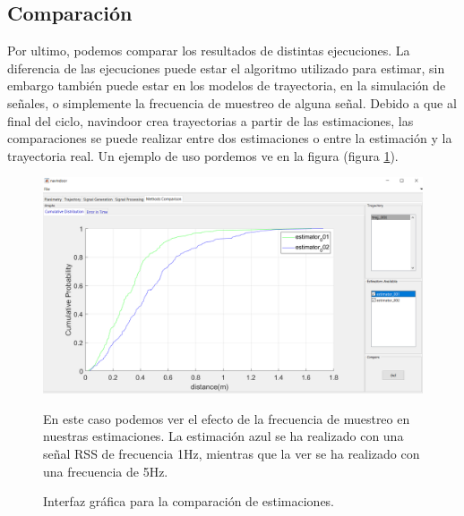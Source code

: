 

\subsection{Comparación}


Por ultimo, podemos comparar los resultados de distintas ejecuciones. La diferencia de las ejecuciones puede estar el algoritmo utilizado para estimar, sin embargo también puede estar en los modelos de trayectoria, en la simulación de señales, o simplemente la frecuencia de muestreo de alguna señal. Debido a que al final del ciclo, navindoor crea trayectorias a partir de las estimaciones, las comparaciones se puede realizar entre dos estimaciones o entre la estimación y la trayectoria real. Un ejemplo de uso pordemos ve en la figura (figura \ref{fig:interfaz5}). 

\begin{figure}
    \centering
    \includegraphics[width=0.8\columnwidth]{img/Design/5.PNG}
    \caption[]{Interfaz gráfica para la comparación de estimaciones.}
    \label{fig:interfaz5}
    \footnotesize 
    En este caso podemos ver el efecto de la frecuencia de muestreo en nuestras estimaciones. La estimación azul se ha realizado con una señal RSS de frecuencia 1Hz, mientras que la ver se ha realizado con una frecuencia de 5Hz.
\end{figure}
